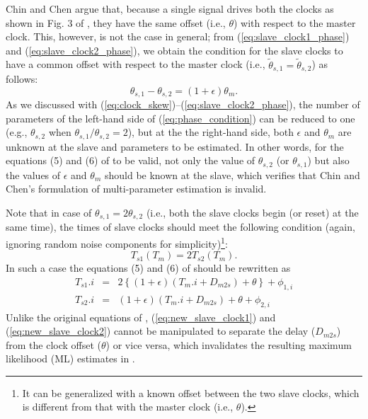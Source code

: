 \documentclass[journal,twoside,final]{IEEEtran}
\begin{document}
Chin and Chen argue that, because a single signal drives both the clocks as
shown in Fig. 3 of \cite{chin09:_ieee}, they have the same offset (i.e.,
$\theta$) with respect to the master clock. This, however, is not the case in
general; from (\ref{eq:slave_clock1_phase}) and (\ref{eq:slave_clock2_phase}),
we obtain the condition for the slave clocks to have a common offset with
respect to the master clock (i.e., $\tilde{\theta}_{s,1}=\tilde{\theta}_{s,2}$)
as follows:
\begin{equation}
  \label{eq:phase_condition}
  \theta_{s,1} - \theta_{s,2} = \left(1 + \epsilon\right)\theta_{m} .
\end{equation}
As we discussed with (\ref{eq:clock_skew})--(\ref{eq:slave_clock2_phase}), the
number of parameters of the left-hand side of (\ref{eq:phase_condition}) can be
reduced to one (e.g., $\theta_{s,2}$ when $\theta_{s,1}/\theta_{s,2}=2$), but at
the the right-hand side, both $\epsilon$ and $\theta_{m}$ are unknown at the
slave and parameters to be estimated. In other words, for the equations (5) and
(6) of \cite{chin09:_ieee} to be valid, not only the value of $\theta_{s,2}$ (or
$\theta_{s,1}$) but also the values of $\epsilon$ and $\theta_{m}$ should be
known at the slave, which verifies that Chin and Chen's formulation of
multi-parameter estimation is invalid.

Note that in case of $\theta_{s,1}=2\theta_{s,2}$ (i.e., both the slave clocks
begin (or reset) at the same time), the times of slave clocks should meet the
following condition (again, ignoring random noise components for
simplicity)\footnote{It can be generalized with a known offset between the two
  slave clocks, which is different from that with the master clock (i.e.,
  $\theta$).}:
\begin{equation}
  \label{eq:slave_clocks}
  T_{s1}(T_{m}) = 2 T_{s2}(T_{m}) .
\end{equation}
In such a case the equations (5) and (6) of \cite{chin09:_ieee} should be
rewritten as
\begingroup
\setlength{\arraycolsep}{0.0em}
\begin{eqnarray}
  T_{s1}.i &{=}& 2 \left\{\left(1 + \epsilon\right) \left(T_{m}.i + D_{m2s}\right) + \theta\right\} + \phi_{1,i} \label{eq:new_slave_clock1} \\
  T_{s2}.i &{=}& \left( 1 + \epsilon\right) \left(T_{m}.i + D_{m2s}\right) + \theta + \phi_{2,i} \label{eq:new_slave_clock2} 
\end{eqnarray}
\endgroup
Unlike the original equations of \cite{chin09:_ieee},
(\ref{eq:new_slave_clock1}) and (\ref{eq:new_slave_clock2}) cannot be
manipulated to separate the delay ($D_{m2s}$) from the clock offset ($\theta$)
or vice versa, which invalidates the resulting maximum likelihood (ML) estimates
in \cite{chin09:_ieee}.
\end{document}
